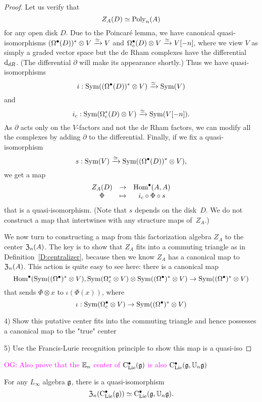 \documentclass[11pt]{amsart}
\numberwithin{equation}{section}
\def\owen{\textcolor{magenta}{OG: }\textcolor{magenta}}
\begin{document}
\begin{proof}
Let us verify that 
\[
Z_A(D) \simeq {\rm Poly}_n(A)
\]
for any open disk $D$.
Due to the Poincar\'e lemma, we have canonical quasi-isomorphisms $(\Omega^\bullet(D))^* \otimes V \xrightarrow{\simeq} V$ and $\Omega^\bullet_c(D) \otimes V \xrightarrow{\simeq} V[-n]$,
where we view $V$ as simply a graded vector space but the de Rham complexes have the differential ${\rm d}_{dR}$.
(The differential $\partial$ will make its appearance shortly.)
Thus we have quasi-isomorphisms
\[
i: {\rm Sym}((\Omega^\bullet(D))^* \otimes V) \xrightarrow{\simeq} {\rm Sym}(V)
\]
and 
\[
i_c: {\rm Sym}(\Omega_c^*(D) \otimes V) \xrightarrow{\simeq} {\rm Sym}(V[-n]).
\]
As $\partial$ acts only on the $V$-factors and not the de Rham factors,
we can modify all the complexes by adding $\partial$ to the differential.
Finally, if we fix a quasi-isomorphism 
\[
s: {\rm Sym}(V) \xrightarrow{\simeq} {\rm Sym}((\Omega^\bullet(D))^* \otimes V),
\]
we get a map
\[
\begin{array}{ccc}
Z_A(D) & \to & {\rm Hom}^\bullet(A,A)\\
\Phi & \mapsto & i_c \circ \Phi \circ s
\end{array}
\]
that is a quasi-isomorphism.
(Note that $s$ depends on the disk~$D$. 
We do not construct a map that intertwines with any structure maps of~$Z_A$.)

We now turn to constructing a map from this factorization algebra $Z_A$ to the center ${\frak Z}_n(A)$.
The key is to show that $Z_A$ fits into a commuting triangle as in Definition~\ref{D:centralizer},
because then we know $Z_A$ has a canonical map to~${\frak Z}_n(A)$.
This action is quite easy to see here: there is a canonical map
\[
{\rm Hom}^\bullet({\rm Sym}((\Omega^\bullet)^* \otimes V), {\rm Sym}(\Omega_c^* \otimes V) \otimes {\rm Sym}((\Omega^\bullet)^* \otimes V) \to {\rm Sym}((\Omega^\bullet)^* \otimes V)
\]
that sends $\Phi \otimes x$ to $\iota(\Phi(x))$,
where 
\[
\iota: {\rm Sym}(\Omega_c^\bullet \otimes V) \to {\rm Sym}((\Omega^\bullet)^* \otimes V)
\]

4) Show this putative center fits into the commuting triangle and hence possesses a canonical map to the "true" center

5) Use the Francis-Lurie recognition principle to show this map is a quasi-iso
\end{proof}

\owen{Also prove that the $\mathbb E_n$ center of ${\rm C}_{\rm Lie}^\bullet(\mathfrak g)$ is also ${\rm C}_{\rm Lie}^\bullet(\mathfrak g, \mathbb U_n \mathfrak g)$}

\begin{cor}
\label{cor: koszul dual to main theorem}
For any $L_\infty$ algebra $\mathfrak g$,
there is a quasi-isomorphism
\[
{\frak Z}_n({\rm C}_{\rm Lie}^\bullet(\mathfrak g)) \simeq {\rm C}_{\rm Lie}^\bullet(\mathfrak g, \mathbb U_n \mathfrak g).
\]
\end{cor}
\end{document}

